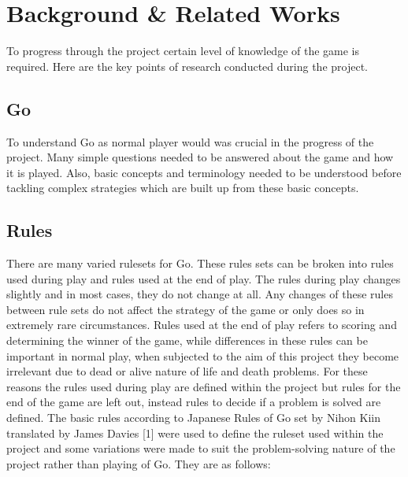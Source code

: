 \documentclass{l4proj}
\begin{document}
\chapter{Background \& Related Works}
To progress through the project certain level of knowledge of the game is required. Here are the key points of research conducted during the project.

\section{Go}
To understand Go as normal player would was crucial in the progress of the project. Many simple questions needed to be answered about the game and how it is played. Also, basic concepts and terminology needed to be understood before tackling complex strategies which are built up from these basic concepts.

\section{Rules}

There are many varied rulesets for Go. These rules sets can be broken into rules used during play and rules used at the end of play. The rules during play changes slightly and in most cases, they do not change at all. Any changes of these rules between rule sets do not affect the strategy of the game or only does so in extremely rare circumstances. Rules used at the end of play refers to scoring and determining the winner of the game, while differences in these rules can be important in normal play, when subjected to the aim of this project they become irrelevant due to dead or alive nature of life and death problems. For these reasons the rules used during play are defined within the project but rules for the end of the game are left out, instead rules to decide if a problem is solved are defined. The basic rules according to Japanese Rules of Go set by Nihon Kiin translated by James Davies [1] were used to define the ruleset used within the project and some variations were made to suit the problem-solving nature of the project rather than playing of Go. They are as follows:
\end{document}
